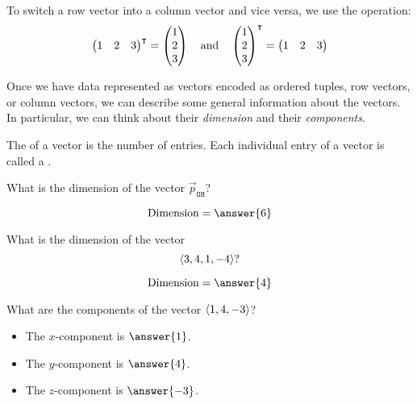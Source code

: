 \documentclass{ximera}
\begin{document}
\begin{definition}
  To switch a row vector into a column vector and vice versa, we use the  operation:
  \[
  \begin{pmatrix} 1 &  2 & 3 \end{pmatrix}^\intercal =
  \begin{pmatrix} 1 \\ 2 \\ 3 \end{pmatrix}
  \quad\text{and}\quad
  \begin{pmatrix} 1 \\ 2 \\ 3 \end{pmatrix}^\intercal =
  \begin{pmatrix} 1 &  2 & 3 \end{pmatrix}
  \]
\end{definition}

Once we have data represented as vectors encoded as ordered tuples,
row vectors, or column vectors, we can describe some general
information about the vectors. In particular, we can think about their
\textit{dimension} and their \textit{components}.

\begin{definition}
The  of a vector is the number of entries. Each
individual entry of a vector is called a .
\end{definition}

\begin{question}
  What is the dimension of the vector $\vec{p}_{\texttt{OH}}$?
  \begin{prompt}
  \[
  \text{Dimension} = \answer{6}
  \]
  \end{prompt}
\end{question}


\begin{question} %
  What is the dimension of the vector 
  \[
  \left\langle 3,4,1,-4\right\rangle?
  \]
  \begin{prompt}
  \[
  \text{Dimension} = \answer{4}
  \]
  \end{prompt}
  \begin{question}
    What are the components of the vector $\left\langle 1,4,-3\right\rangle$?
    \begin{prompt}
      \begin{itemize}
      \item The $x$-component is $\answer{1}$.
      \item The $y$-component is $\answer{4}$.
      \item The $z$-component is $\answer{-3}$.
      \end{itemize}
    \end{prompt}
  \end{question}
\end{question}
\end{document}
